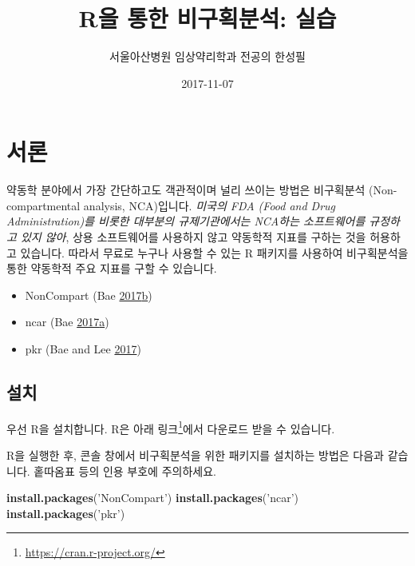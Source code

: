 \documentclass[12pt,]{krantz}
\title{R을 통한 비구획분석: 실습}
\author{서울아산병원 임상약리학과 전공의 한성필}
\date{2017-11-07}
\newenvironment{Shaded}{\begin{snugshade}}{\end{snugshade}}
\newcommand{\KeywordTok}[1]{\textcolor[rgb]{0.13,0.29,0.53}{\textbf{#1}}}
\newcommand{\StringTok}[1]{\textcolor[rgb]{0.31,0.60,0.02}{#1}}
\newcommand{\NormalTok}[1]{#1}
\providecommand{\tightlist}{%
  \setlength{\itemsep}{0pt}\setlength{\parskip}{0pt}}
\let\rmarkdownfootnote\footnote%
\def\footnote{\protect\rmarkdownfootnote}
\begin{document}
\maketitle

{
\hypersetup{linkcolor=black}
\setcounter{tocdepth}{2}
\tableofcontents
}
\mainmatter

\chapter{서론}\label{intro}

약동학 분야에서 가장 간단하고도 객관적이며 널리 쓰이는 방법은 비구획분석
(Non-compartmental analysis, NCA)입니다. \emph{미국의 FDA (Food and Drug
Administration)를 비롯한 대부분의 규제기관에서는 NCA하는 소프트웨어를
규정하고 있지 않아}, 상용 소프트웨어를 사용하지 않고 약동학적 지표를
구하는 것을 허용하고 있습니다. 따라서 무료로 누구나 사용할 수 있는 R
패키지를 사용하여 비구획분석을 통한 약동학적 주요 지표를 구할 수
있습니다.

\begin{itemize}
\tightlist
\item
  NonCompart (Bae
  \protect\hyperlink{ref-R-NonCompart}{2017}\protect\hyperlink{ref-R-NonCompart}{b})
\item
  ncar (Bae
  \protect\hyperlink{ref-R-ncar}{2017}\protect\hyperlink{ref-R-ncar}{a})
\item
  pkr (Bae and Lee \protect\hyperlink{ref-R-pkr}{2017})
\end{itemize}

\section{설치}

우선 R을 설치합니다. R은 아래 링크\footnote{\url{https://cran.r-project.org/}}에서
다운로드 받을 수 있습니다.

R을 실행한 후, 콘솔 창에서 비구획분석을 위한 패키지를 설치하는 방법은
다음과 같습니다. 홑따옴표 등의 인용 부호에 주의하세요.

\begin{Shaded}
\begin{Highlighting}[]
\KeywordTok{install.packages}\NormalTok{(}\StringTok{'NonCompart'}\NormalTok{)}
\KeywordTok{install.packages}\NormalTok{(}\StringTok{'ncar'}\NormalTok{)}
\KeywordTok{install.packages}\NormalTok{(}\StringTok{'pkr'}\NormalTok{)}
\end{Highlighting}
\end{Shaded}
\end{document}

